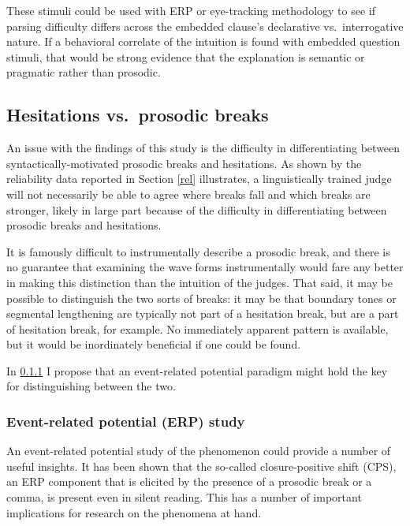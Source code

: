 \documentclass[12pt,oneside]{book}
\begin{document}
These stimuli could be used with ERP or eye-tracking methodology to see if parsing difficulty differs across the embedded clause's declarative vs.~interrogative nature. If a behavioral correlate of the intuition is found with embedded question stimuli, that would be strong evidence that the explanation is semantic or pragmatic rather than prosodic.

\hypertarget{hesitations-vs.-prosodic-breaks}{%
\subsection{Hesitations vs.~prosodic breaks}\label{hesitations-vs.-prosodic-breaks}}

An issue with the findings of this study is the difficulty in differentiating between syntactically-motivated prosodic breaks and hesitations. As shown by the reliability data reported in Section \ref{rel} illustrates, a linguistically trained judge will not necessarily be able to agree where breaks fall and which breaks are stronger, likely in large part because of the difficulty in differentiating between prosodic breaks and hesitations.

It is famously difficult to instrumentally describe a prosodic break, and there is no guarantee that examining the wave forms instrumentally would fare any better in making this distinction than the intuition of the judges. That said, it may be possible to distinguish the two sorts of breaks: it may be that boundary tones or segmental lengthening are typically not part of a hesitation break, but are a part of hesitation break, for example. No immediately apparent pattern is available, but it would be inordinately beneficial if one could be found.

In \ref{erp} I propose that an event-related potential paradigm might hold the key for distinguishing between the two.

\hypertarget{erp}{%
\subsubsection{Event-related potential (ERP) study}\label{erp}}

An event-related potential study of the phenomenon could provide a number of useful insights. It has been shown that the so-called closure-positive shift (CPS), an ERP component that is elicited by the presence of a prosodic break or a comma, is present even in silent reading. This has a number of important implications for research on the phenomena at hand.
\end{document}
